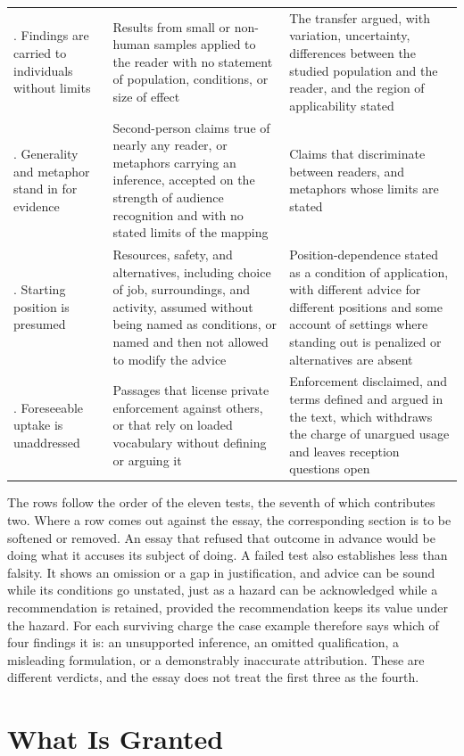 \documentclass[12pt]{article}
\begin{document}
{\begin{longtable}{>{\raggedright\arraybackslash}p{} >{\raggedright\arraybackslash}p{} >{\raggedright\arraybackslash}p{}}
8. Findings are carried to individuals without limits & Results from small or non-human samples applied to the reader with no statement of population, conditions, or size of effect & The transfer argued, with variation, uncertainty, differences between the studied population and the reader, and the region of applicability stated \\
9. Generality and metaphor stand in for evidence & Second-person claims true of nearly any reader, or metaphors carrying an inference, accepted on the strength of audience recognition and with no stated limits of the mapping & Claims that discriminate between readers, and metaphors whose limits are stated \\
10. Starting position is presumed & Resources, safety, and alternatives, including choice of job, surroundings, and activity, assumed without being named as conditions, or named and then not allowed to modify the advice & Position-dependence stated as a condition of application, with different advice for different positions and some account of settings where standing out is penalized or alternatives are absent \\
11. Foreseeable uptake is unaddressed & Passages that license private enforcement against others, or that rely on loaded vocabulary without defining or arguing it & Enforcement disclaimed, and terms defined and argued in the text, which withdraws the charge of unargued usage and leaves reception questions open \\
\hline
\end{longtable}
}

\noindent The rows follow the order of the eleven tests, the seventh of which contributes two. Where a row comes out against the essay, the corresponding section is to be softened or removed. An essay that refused that outcome in advance would be doing what it accuses its subject of doing. A failed test also establishes less than falsity. It shows an omission or a gap in justification, and advice can be sound while its conditions go unstated, just as a hazard can be acknowledged while a recommendation is retained, provided the recommendation keeps its value under the hazard. For each surviving charge the case example therefore says which of four findings it is: an unsupported inference, an omitted qualification, a misleading formulation, or a demonstrably inaccurate attribution. These are different verdicts, and the essay does not treat the first three as the fourth.

\section{What Is Granted}\label{sec:granted}
\end{document}
